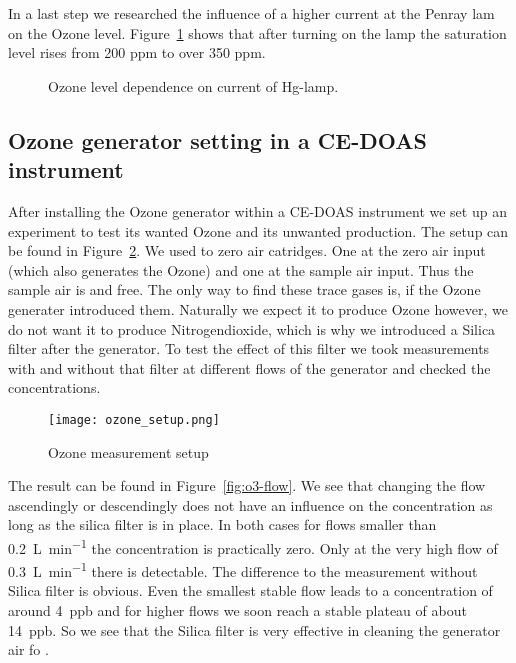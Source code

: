 In a last step we researched the influence of a higher current at the
Penray lam on the Ozone level. Figure~\ref{fig:lamp} shows that after
turning on the lamp the saturation level rises from 200 ppm to over
350 ppm.

\begin{figure}[htbp]
  \centering
  \caption{Ozone level dependence on current of Hg-lamp.}
  \label{fig:lamp}
\end{figure}

\subsection{Ozone generator setting in a CE-DOAS instrument}
\label{sec:o3-setting-doas}

After installing the Ozone generator within a CE-DOAS instrument we
set up an experiment to test its wanted Ozone and its unwanted
 production. The setup can be found in
Figure~\ref{fig:ozone-flow-setup}. We used to zero air catridges. One
at the zero air input (which also generates the Ozone) and one at the
sample air input. Thus the sample air is  and 
free. The only way to find these trace gases is, if the Ozone
generater introduced them. Naturally we expect it to produce Ozone
however, we do not want it to produce Nitrogendioxide, which is why we
introduced a Silica filter after the generator. To test the effect of
this filter we took measurements with and without that filter at
different flows of the generator and checked the concentrations.

\begin{figure}[htbp]
  \centering
  \texttt{[image: ozone\_setup.png]}
  \caption{Ozone measurement setup}
  \label{fig:ozone-flow-setup}
\end{figure}

The result can be found in Figure~\ref{fig:o3-flow}. We see that
changing the flow ascendingly or descendingly does not have an
influence on the  concentration as long as the silica filter
is in place. In both cases for flows smaller than
\SI{0.2}{\liter\per\minute} the concentration is practically
zero. Only at the very high flow of \SI{0.3}{\liter\per\minute} there
is  detectable. The difference to the measurement without
Silica filter is obvious. Even the smallest stable flow leads to a
concentration of around \SI{4}{ppb} and for higher flows we soon reach
a stable plateau of about \SI{14}{ppb}. So we see that the Silica
filter is very effective in cleaning the generator air fo .

